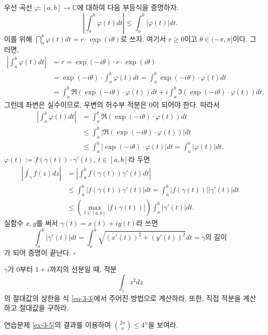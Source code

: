 우선 곡선 $\varphi : [a,b] \to \mathbb C$에 대하여 다음 부등식을 증명하자.
\[
\left| \int_a^b \varphi(t)dt \right|
\le \int_a^b |\varphi(t)|dt.
\]
이를 위해 $\dint_a^b \varphi(t) dt = r\cdot \exp(i\theta)$로 쓰자.
여기서 $r\ge 0$이고 $\theta \in (-\pi, \pi]$이다.
그러면,
\begin{align*}
\left| \int_a^b \varphi(t)dt \right|
&= r = \exp(-i\theta)\cdot r \cdot \exp(i\theta) \\
&= \exp(-i\theta) \cdot \int_a^b \varphi(t)dt
= \int_a^b \exp(-i\theta) \cdot \varphi(t)dt \\
&= \int_a^b \Re(\exp(-i\theta)\cdot\varphi(t))dt
+ i \int_a^b \Im(\exp(-i\theta)\cdot\varphi(t))dt.
\end{align*}
그런데 좌변은 실수이므로, 우변의 허수부 적분은 $0$이 되어야 한다.
따라서 
\begin{align*}
\left| \int_a^b \varphi(t)dt \right|
&= \int_a^b \Re(\exp(-i\theta)\cdot\varphi(t))dt \\
&\le \int_a^b |\Re(\exp(-i\theta)\cdot\varphi(t))|dt \\
&\le \int_a^b | \exp(-i\theta) \cdot \varphi(t)| dt
= \int_a^b |\varphi(t)| dt. 
\end{align*}
$\varphi(t) := f(\gamma(t))\cdot \gamma'(t)$, $t\in[a,b]$라 두면
\begin{align*}
\left| \int_\gamma f(z)dz \right| 
&= \left| \int_a^b f(\gamma(t)) \gamma'(t) dt \right| \\
&\le \int_a^b |f(\gamma(t)) \gamma'(t)| dt
= \int_a^b |f(\gamma(t))| | \gamma'(t)| dt \\
&\le \left( \max_{t\in[a,b]} |f(\gamma(t))| \right) 
\int_a^b |\gamma'(t)|dt.
\end{align*}
실함수 $x, y$를 써서  $\gamma(t) = x(t) + iy(t)$라 쓰면
\[
\int_a^b |\gamma'(t)|dt 
= \int_a^b  \sqrt{ (x'(t))^2 + (y'(t))^2} dt
= \gamma \text{의 길이}
\]
가 되어 증명이 끝난다.
\hfill $\square$

\begin{salt_exercise} \label{ex-3-9}
$\gamma$가 $0$부터 $1+i$까지의 선분일 때,
적분 
\[
\int_\gamma z^2dz
\] 
의 절대값의 상한을 식 \eqref{eq-3-3}에서 주어진 방법으로 계산하라.
또한, 직접 적분을 계산하고 절대값을 구하라.
\end{salt_exercise}

\begin{salt_exercise} \label{ex-3-10}
연습문제 \ref{ex-3-5}의 결과를 이용하여
$\displaystyle{2n \choose n} \le 4^n$을 보여라.
\end{salt_exercise}

